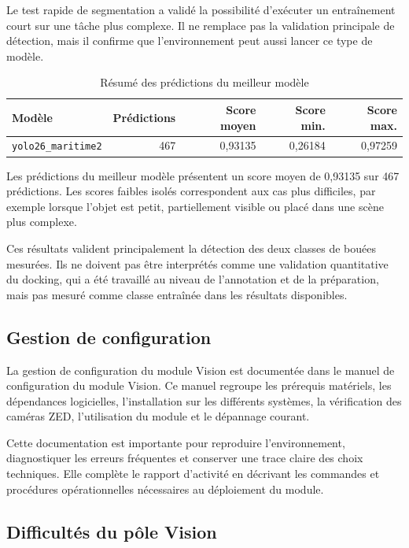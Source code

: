 \documentclass[11pt,letterpaper]{article}
\begin{document}
Le test rapide de segmentation a validé la possibilité d'exécuter un entraînement court sur une tâche plus complexe. Il ne remplace pas la validation principale de détection, mais il confirme que l'environnement peut aussi lancer ce type de modèle.

\begin{table}[H]
    \centering
    \caption{Résumé des prédictions du meilleur modèle}
    \begin{tabular}{L{4.8cm}rrrr}
        \toprule
        Modèle & Prédictions & Score moyen & Score min. & Score max. \\
        \midrule
        \texttt{yolo26\_maritime2} & 467 & 0,93135 & 0,26184 & 0,97259 \\
        \bottomrule
    \end{tabular}
\end{table}

Les prédictions du meilleur modèle présentent un score moyen de 0,93135 sur 467 prédictions. Les scores faibles isolés correspondent aux cas plus difficiles, par exemple lorsque l'objet est petit, partiellement visible ou placé dans une scène plus complexe.

Ces résultats valident principalement la détection des deux classes de bouées mesurées. Ils ne doivent pas être interprétés comme une validation quantitative du docking, qui a été travaillé au niveau de l'annotation et de la préparation, mais pas mesuré comme classe entraînée dans les résultats disponibles.

\subsection{Gestion de configuration}

La gestion de configuration du module Vision est documentée dans le manuel de configuration du module Vision. Ce manuel regroupe les prérequis matériels, les dépendances logicielles, l'installation sur les différents systèmes, la vérification des caméras ZED, l'utilisation du module et le dépannage courant.

Cette documentation est importante pour reproduire l'environnement, diagnostiquer les erreurs fréquentes et conserver une trace claire des choix techniques. Elle complète le rapport d'activité en décrivant les commandes et procédures opérationnelles nécessaires au déploiement du module.

\subsection{Difficultés du pôle Vision}
\end{document}
